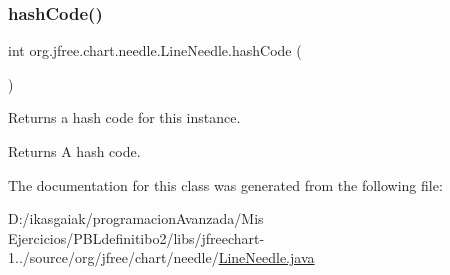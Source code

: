 \subsubsection{\texorpdfstring{hash\+Code()}{hashCode()}}
{\footnotesize\ttfamily int org.\+jfree.\+chart.\+needle.\+Line\+Needle.\+hash\+Code (\begin{DoxyParamCaption}{ }\end{DoxyParamCaption})}

Returns a hash code for this instance.

\begin{DoxyReturn}{Returns}
A hash code. 
\end{DoxyReturn}


The documentation for this class was generated from the following file\+:\begin{DoxyCompactItemize}
\item 
D\+:/ikasgaiak/programacion\+Avanzada/\+Mis Ejercicios/\+P\+B\+Ldefinitibo2/libs/jfreechart-\/1../source/org/jfree/chart/needle/\mbox{\hyperlink{_line_needle_8java}{Line\+Needle.\+java}}\end{DoxyCompactItemize}
